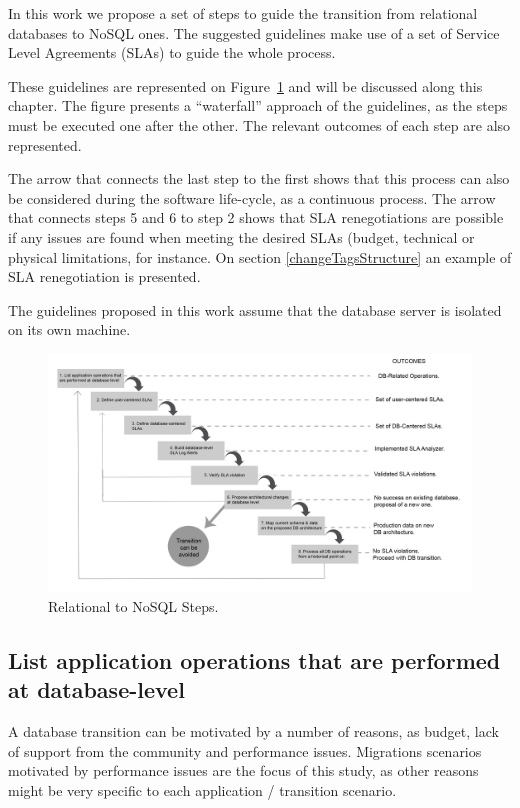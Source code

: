 In this work we propose a set of steps to guide the transition from relational databases to NoSQL ones. The suggested guidelines make use of a set of Service Level Agreements (SLAs) to guide the whole process. 

These guidelines are represented on Figure~\ref{fig:guidelinesNoSQL} and will be discussed along this chapter. The figure presents a ``waterfall'' approach of the guidelines, as the steps must be executed one after the other. The relevant outcomes of each step are also represented. 

The arrow that connects the last step to the first shows that this process can also be considered during the software life-cycle, as a continuous process. The arrow that connects steps 5 and 6 to step 2 shows that SLA renegotiations are possible if any issues are found when meeting the desired SLAs (budget, technical or physical limitations, for instance. On section \ref{changeTagsStructure} an example of SLA renegotiation is presented.

The guidelines proposed in this work assume that the database server is isolated on its own machine.

\begin{figure}[ht!]
\centering
\includegraphics[width=170mm]{Imagens/guidelines.png}
\caption{Relational to NoSQL Steps.\label{fig:guidelinesNoSQL}}
\end{figure}


\subsection{List application operations that are performed at database-level}

A database transition can be motivated by a number of reasons, as budget, lack of support from the community and performance issues. Migrations scenarios motivated by performance issues are the focus of this study, as other reasons might be very specific to each application / transition scenario. 

